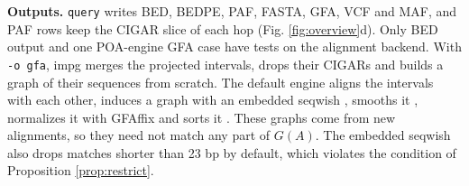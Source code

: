 \textbf{Outputs.}
\texttt{query} writes BED, BEDPE, PAF, FASTA, GFA, VCF and MAF, and PAF rows keep the CIGAR slice of each hop (Fig. \ref{fig:overview}d).
Only BED output and one POA-engine GFA case have tests on the alignment backend.
With \texttt{-o gfa}, impg merges the projected intervals, drops their CIGARs and builds a graph of their sequences from scratch.
The default engine aligns the intervals with each other, induces a graph with an embedded seqwish \citep{Garrison2023seqwish}, smooths it \citep{Garrison2025smoothxg}, normalizes it with GFAffix \citep{Doerr2026gfaffix} and sorts it \citep{Garrison2026gfasort}.
These graphs come from new alignments, so they need not match any part of $G(A)$.
The embedded seqwish also drops matches shorter than 23 bp by default, which violates the condition of Proposition \ref{prop:restrict}.

